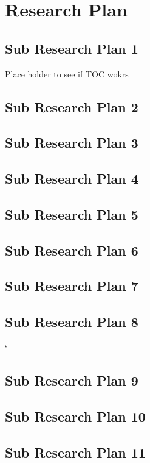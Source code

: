 \fancyhf{}
\fancyfoot[C]{ \thepage}

\chapter[Research Plan]{Research Plan}
\section{Sub Research Plan 1}
Place holder to see if TOC wokrs
\section{Sub Research Plan 2}
\section{Sub Research Plan 3}
\section{Sub Research Plan 4}
\section{Sub Research Plan 5}
\section{Sub Research Plan 6}
\section{Sub Research Plan 7}
\section{Sub Research Plan 8}`
\section{Sub Research Plan 9}
\section{Sub Research Plan 10}
\section{Sub Research Plan 11}
